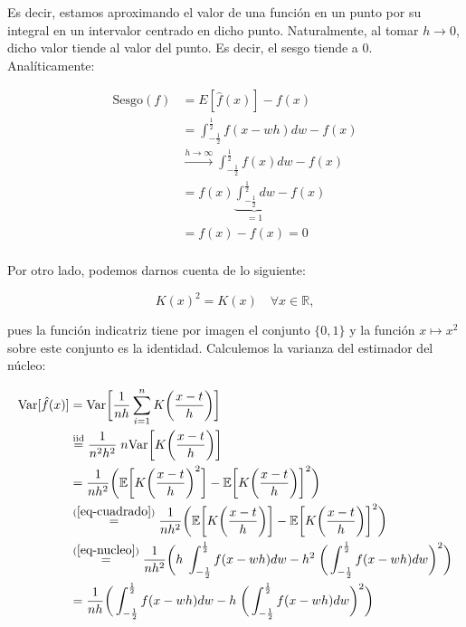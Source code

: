 \documentclass[a4paper]{article}
\newcommand{\R}{\mathbb{R}}
\newcommand{\E}{\mathbb{E}}
\newcommand{\Var}{\text{Var}}
\begin{document}
Es decir, estamos aproximando el valor de una función en un punto por su integral en un intervalor centrado en dicho punto. Naturalmente, al tomar $h \rightarrow 0$, dicho valor tiende al valor del punto. Es decir, el sesgo tiende a $0$. Analíticamente:

\begin{align*}
	\text{Sesgo}(f) & = E [ \hat f(x) ] - f(x) \\
	& = \int_{-\frac{1}{2}}^{\frac{1}{2}} f(x - wh) dw - f(x) \\
	& \stackrel{h \rightarrow \infty}{\longrightarrow} \int_{-\frac{1}{2}}^{\frac{1}{2}} f(x) dw - f(x) \\
	& =  f(x) \underbrace{\int_{-\frac{1}{2}}^{\frac{1}{2}} dw}_{= 1} - f(x) \\
	& =  f(x) - f(x) = 0 \\
\end{align*}

Por otro lado, podemos darnos cuenta de lo siguiente:

\begin{equation}
	\label{eq-cuadrado}
	K(x)^2 = K(x) \quad \forall x \in \R,
\end{equation}

pues la función indicatriz tiene por imagen el conjunto $\{0,1\}$ y la función $x \mapsto x^2$ sobre este conjunto es la identidad. Calculemos la varianza del estimador del núcleo:

\begin{align*}
	\Var [ \hat f(x)] & = \Var \bigg[ \frac{1}{nh} \sum_{i=1}^n K\bigg(\frac{x - t}{h}\bigg) \bigg] \\
	& \stackrel{\text{iid}}{=} \frac{1}{n^2 h^2} \; n \Var \bigg[ K\bigg(\frac{x - t}{h}\bigg) \bigg] \\
	& = \frac{1}{n h^2} \bigg( \E \bigg[ K\bigg(\frac{x - t}{h}\bigg)^2 \bigg] - \E \bigg[ K\bigg(\frac{x - t}{h}\bigg) \bigg]^2 \bigg)  \\
	& \stackrel{(\ref{eq-cuadrado})}{=} \frac{1}{n h^2} \bigg( \E \bigg[ K\bigg(\frac{x - t}{h}\bigg) \bigg] - \E \bigg[ K\bigg(\frac{x - t}{h}\bigg) \bigg]^2 \bigg)  \\
	& \stackrel{(\ref{eq-nucleo})}{=} \frac{1}{n h^2} \bigg( h \; \int_{-\frac{1}{2}}^{\frac{1}{2}} f(x - wh) dw - h^2 \; \bigg( \int_{-\frac{1}{2}}^{\frac{1}{2}} f(x - wh) dw\bigg) ^2 \bigg) \\
	& = \frac{1}{n h} \bigg( \int_{-\frac{1}{2}}^{\frac{1}{2}} f(x - wh) dw - h \; \bigg( \int_{-\frac{1}{2}}^{\frac{1}{2}} f(x - wh) dw\bigg) ^2 \bigg) \\
\end{align*}
\end{document}
